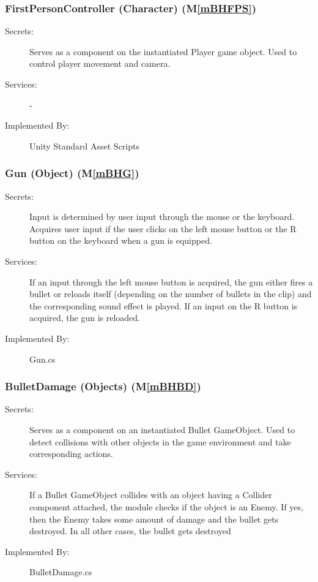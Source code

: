 \documentclass[12pt, titlepage]{article}
\newcommand{\mref}[1]{M\ref{#1}}
\begin{document}
\subsubsection{FirstPersonController (Character) (\mref{mBHFPS})}

\begin{description}
	\item[Secrets:] Serves as a component on the instantiated Player game object. Used to control player movement and camera.
	\item[Services:] -
	\item[Implemented By:] Unity Standard Asset Scripts
\end{description}

\subsubsection{Gun (Object) (\mref{mBHG})}

\begin{description}
	\item[Secrets:] Input is determined by user input through the mouse or the keyboard. Acquires user input if the user clicks on the left mouse button or the R button on the keyboard when a gun is equipped.
	\item[Services:] If an input through the left mouse button is acquired, the gun either fires a bullet or reloads itself (depending on the number of bullets in the clip) and the corresponding sound effect is played. If an input on the R button is acquired, the gun is reloaded.
	\item[Implemented By:] Gun.cs
\end{description}

\subsubsection{BulletDamage (Objects) (\mref{mBHBD})}

\begin{description}
	\item[Secrets:] Serves as a component on an instantiated Bullet GameObject. Used to detect collisions with other objects in the game environment and take corresponding actions.
	\item[Services:] If a Bullet GameObject collides with an object having a Collider component attached, the module checks if the object is an Enemy. If yes, then the Enemy takes some amount of damage and the bullet gets destroyed. In all other cases, the bullet gets destroyed
	\item[Implemented By:] BulletDamage.cs
\end{description}
\end{document}
